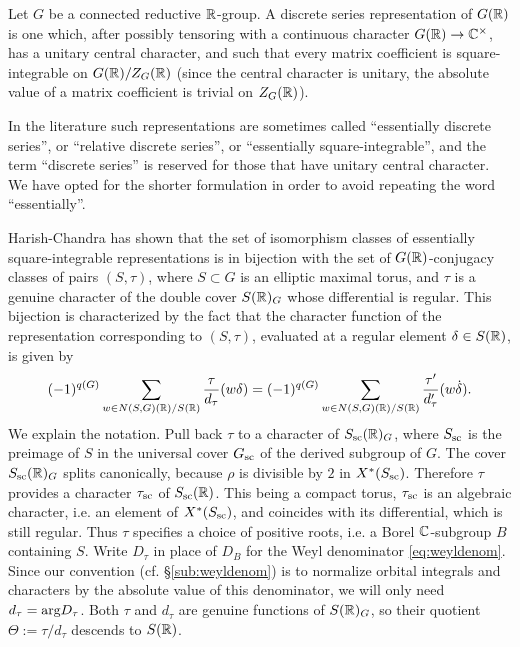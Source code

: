 \documentclass{article}
\theoremstyle{definition}
\numberwithin{equation}{section}
\renewcommand{\-}{\hyp{}}
\begin{document}
Let $G$ be a connected reductive $\mathbb{R}$-group. A discrete series representation of $G(\mathbb{R})$ is one which, after possibly tensoring with a continuous character $G(\mathbb{R}) \to \mathbb{C}^\times$, has a unitary central character, and such that every matrix coefficient is square-integrable on $G(\mathbb{R})/Z_G(\mathbb{R})$ (since the central character is unitary, the absolute value of a matrix coefficient is trivial on $Z_G(\mathbb{R})$).

In the literature such representations are sometimes called ``essentially discrete series'', or ``relative discrete series'', or ``essentially square-integrable'', and the term ``discrete series'' is reserved for those that have unitary central character. We have opted for the shorter formulation in order to avoid repeating the word ``essentially''.

Harish-Chandra has shown that the set of isomorphism classes of essentially square-integrable representations is in bijection with the set of $G(\mathbb{R})$-conjugacy classes of pairs $(S,\tau)$, where $S \subset G$ is an elliptic maximal torus, and $\tau$ is a genuine character of the double cover $S(\mathbb{R})_G$ whose differential is regular. This bijection is characterized by the fact that the character function of the representation corresponding to $(S,\tau)$, evaluated at a regular element $\delta \in S(\mathbb{R})$, is given by
\begin{equation} \label{eq:charfmla}
(-1)^{q(G)}\sum_{w \in N(S,G)(\mathbb{R})/S(\mathbb{R})} \frac{\tau}{d_\tau}(w\delta) = (-1)^{q(G)}\sum_{w \in N(S,G)(\mathbb{R})/S(\mathbb{R})} \frac{\tau'}{d'_\tau}(w\dot\delta).
\end{equation}
We explain the notation. Pull back $\tau$ to a character of $S_{\textrm{sc}}(\mathbb{R})_G$, where $S_{\textrm{sc}}$ is the preimage of $S$ in the universal cover $G_{\textrm{sc}}$ of the derived subgroup of $G$. The cover $S_{\textrm{sc}}(\mathbb{R})_G$ splits canonically, because $\rho$ is divisible by $2$ in $X^*(S_{\textrm{sc}})$. Therefore $\tau$ provides a character $\tau_{\textrm{sc}}$ of $S_{\textrm{sc}}(\mathbb{R})$. This being a compact torus, $\tau_{\textrm{sc}}$ is an algebraic character, i.e. an element of $X^*(S_{\textrm{sc}})$, and coincides with its differential, which is still regular. Thus $\tau$ specifies a choice of positive roots, i.e. a Borel $\mathbb{C}$-subgroup $B$ containing $S$. Write $D_\tau$ in place of $D_B$ for the Weyl denominator \eqref{eq:weyldenom}. Since our convention (cf. \S\ref{sub:weyldenom}) is to normalize orbital integrals and characters by the absolute value of this denominator, we will only need $d_\tau=\textrm{arg}D_\tau$. Both $\tau$ and $d_\tau$ are genuine functions of $S(\mathbb{R})_G$, so their quotient $\Theta:=\tau/d_\tau$ descends to $S(\mathbb{R})$.
\end{document}
